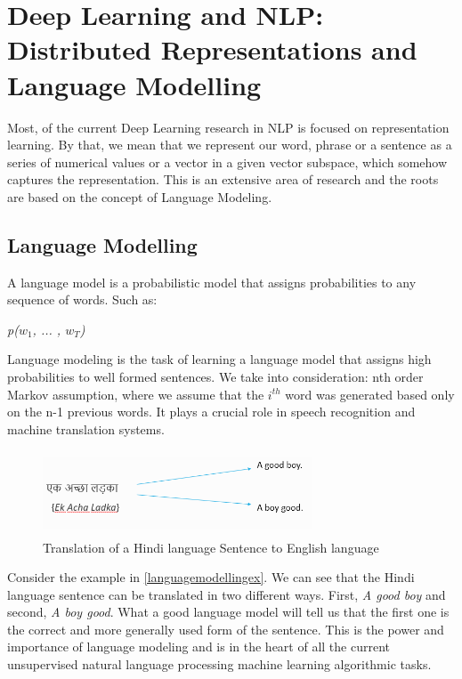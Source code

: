 \chapter{Deep Learning and NLP: Distributed Representations and Language Modelling}\label{chapter:deepnlp}
Most, of the current Deep Learning research in NLP is focused on representation learning. By that, we mean that we represent our word, phrase or a sentence as a series of numerical values or a vector in a given vector subspace, which somehow captures the representation. This is an extensive area of research and the roots are based on the concept of Language Modeling.  
\section{Language Modelling}
A language model is a probabilistic model that assigns probabilities to any sequence of words. Such as: 
\begin{center}
\textit{p(${w}_{1}$, ... , ${w}_{T}$)}
\end{center}
Language modeling is the task of learning a language model that assigns high probabilities to well formed sentences. We take into consideration: nth order Markov assumption, where we assume that the ${i}^{th}$ word was generated based only on the n-1 previous words. It plays a crucial role in speech recognition and machine translation systems. 

\begin{figure}[ht!]
  \centering
  \includegraphics[height=25mm,  width=80mm]{figures/4_languagemodellingex.png}
  \caption[Language Modeling Example]{Translation of a Hindi language Sentence to English language }
  \label{languagemodellingex}
\end{figure}

Consider the example in \autoref{languagemodellingex}. We can see that the Hindi language sentence can be translated in two different ways. First, \textit{A good boy} and second,  \textit{A boy good}. What a good language model will tell us that the first one is the correct and more generally used form of the sentence. This is the power and importance of language modeling and is in the heart of all the current unsupervised natural language processing machine learning algorithmic tasks.


